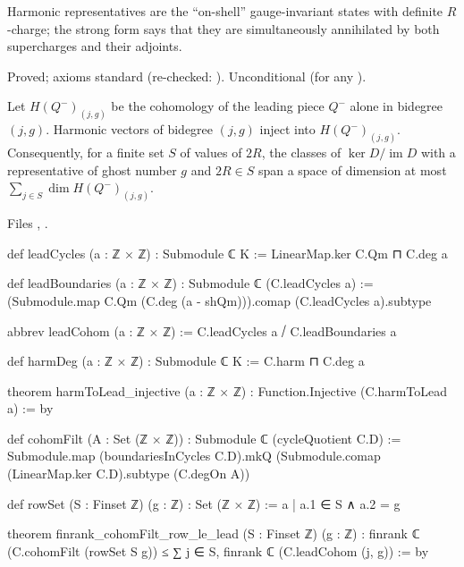 \begin{physics}
Harmonic representatives are the ``on-shell'' gauge-invariant states with definite $R$-charge; the strong form says that they are
simultaneously annihilated by both supercharges and their adjoints.
\end{physics}

\begin{status}
Proved; axioms standard (re-checked: ). Unconditional (for any ).
\end{status}

\begin{theorem}\label{l28:thm:harmbound}
Let $H(Q^-)_{(j,g)}$ be the cohomology of the leading piece $Q^-$ alone in bidegree $(j,g)$. Harmonic vectors of bidegree $(j,g)$ inject into
$H(Q^-)_{(j,g)}$. Consequently, for a finite set $S$ of values of $2R$, the classes of $\ker D/\operatorname{im}D$ with a representative of
ghost number $g$ and $2R\in S$ span a space of dimension at most $\sum_{j\in S}\dim H(Q^-)_{(j,g)}$.
\end{theorem}

\noindent Files ,
.
\begin{leancode}
def leadCycles (a : ℤ × ℤ) : Submodule ℂ K := LinearMap.ker C.Qm ⊓ C.deg a

def leadBoundaries (a : ℤ × ℤ) : Submodule ℂ (C.leadCycles a) :=
  (Submodule.map C.Qm (C.deg (a - shQm))).comap (C.leadCycles a).subtype

abbrev leadCohom (a : ℤ × ℤ) := C.leadCycles a ⧸ C.leadBoundaries a

def harmDeg (a : ℤ × ℤ) : Submodule ℂ K := C.harm ⊓ C.deg a

theorem harmToLead_injective (a : ℤ × ℤ) : Function.Injective (C.harmToLead a) := by

def cohomFilt (A : Set (ℤ × ℤ)) : Submodule ℂ (cycleQuotient C.D) :=
  Submodule.map (boundariesInCycles C.D).mkQ
    (Submodule.comap (LinearMap.ker C.D).subtype (C.degOn A))

def rowSet (S : Finset ℤ) (g : ℤ) : Set (ℤ × ℤ) := {a | a.1 ∈ S ∧ a.2 = g}

theorem finrank_cohomFilt_row_le_lead (S : Finset ℤ) (g : ℤ) :
    finrank ℂ (C.cohomFilt (rowSet S g)) ≤ ∑ j ∈ S, finrank ℂ (C.leadCohom (j, g)) := by
\end{leancode}

